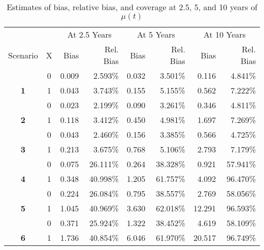 \begin{table}

\caption{Estimates of bias, relative bias, and coverage at 2.5, 5, and 10 years of $\mu(t)$}
\centering
\begin{tabular}[t]{>{}ccrrrrrr}
\toprule
\multicolumn{2}{c}{ } & \multicolumn{2}{c}{At 2.5 Years} & \multicolumn{2}{c}{At 5 Years} & \multicolumn{2}{c}{At 10 Years} \\
\cmidrule(l{3pt}r{3pt}){3-4} \cmidrule(l{3pt}r{3pt}){5-6} \cmidrule(l{3pt}r{3pt}){7-8}
Scenario & X & Bias & Rel. Bias & Bias & Rel. Bias & Bias & Rel. Bias\\
\midrule
 & 0 & 0.009 & 2.593\% & 0.032 & 3.501\% & 0.116 & 4.841\%\\

\multirow[t]{-2}{*}{\centering\arraybackslash \textbf{1}} & 1 & 0.043 & 3.743\% & 0.155 & 5.155\% & 0.562 & 7.222\%\\

 & 0 & 0.023 & 2.199\% & 0.090 & 3.261\% & 0.346 & 4.811\%\\

\multirow[t]{-2}{*}{\centering\arraybackslash \textbf{2}} & 1 & 0.118 & 3.412\% & 0.450 & 4.981\% & 1.697 & 7.269\%\\

 & 0 & 0.043 & 2.460\% & 0.156 & 3.385\% & 0.566 & 4.725\%\\

\multirow[t]{-2}{*}{\centering\arraybackslash \textbf{3}} & 1 & 0.213 & 3.675\% & 0.768 & 5.106\% & 2.793 & 7.179\%\\

\rule{0pt}{4ex}
 & 0 & 0.075 & 26.111\% & 0.264 & 38.328\% & 0.921 & 57.941\%\\

\multirow[t]{-2}{*}{\centering\arraybackslash \textbf{4}} & 1 & 0.348 & 40.998\% & 1.205 & 61.757\% & 4.092 & 96.470\%\\

 & 0 & 0.224 & 26.084\% & 0.795 & 38.557\% & 2.769 & 58.056\%\\

\multirow[t]{-2}{*}{\centering\arraybackslash \textbf{5}} & 1 & 1.045 & 40.969\% & 3.630 & 62.018\% & 12.291 & 96.593\%\\

 & 0 & 0.371 & 25.924\% & 1.322 & 38.452\% & 4.619 & 58.109\%\\

\multirow[t]{-2}{*}{\centering\arraybackslash \textbf{6}} & 1 & 1.736 & 40.854\% & 6.046 & 61.970\% & 20.517 & 96.749\%\\


\end{tabular}
\end{table}
